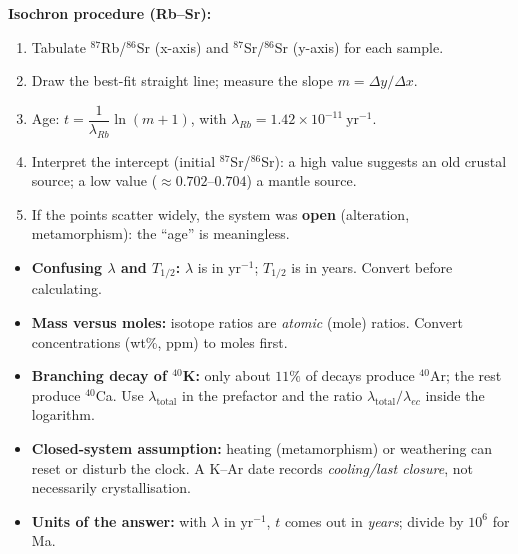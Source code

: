 \documentclass[11pt]{article}
\begin{document}
\begin{methode}
\textbf{Isochron procedure (Rb--Sr):}
\begin{enumerate}
    \item Tabulate $^{87}$Rb/$^{86}$Sr (x-axis) and $^{87}$Sr/$^{86}$Sr (y-axis) for each sample.
    \item Draw the best-fit straight line; measure the slope $m = \Delta y / \Delta x$.
    \item Age: $t = \dfrac{1}{\lambda_{Rb}} \ln(m+1)$, with $\lambda_{Rb} = 1.42 \times 10^{-11}\ \mathrm{yr^{-1}}$.
    \item Interpret the intercept (initial $^{87}$Sr/$^{86}$Sr): a high value suggests an old crustal source; a low value ($\approx 0.702$--$0.704$) a mantle source.
    \item If the points scatter widely, the system was \textbf{open} (alteration, metamorphism): the ``age'' is meaningless.
\end{enumerate}

\begin{attention}
\begin{itemize}
    \item \textbf{Confusing $\lambda$ and $T_{1/2}$:} $\lambda$ is in $\mathrm{yr^{-1}}$; $T_{1/2}$ is in years. Convert before calculating.
    \item \textbf{Mass versus moles:} isotope ratios are \emph{atomic} (mole) ratios. Convert concentrations (wt\%, ppm) to moles first.
    \item \textbf{Branching decay of $^{40}$K:} only about $11\%$ of decays produce $^{40}$Ar; the rest produce $^{40}$Ca. Use $\lambda_{\text{total}}$ in the prefactor and the ratio $\lambda_{\text{total}}/\lambda_{ec}$ inside the logarithm.
    \item \textbf{Closed-system assumption:} heating (metamorphism) or weathering can reset or disturb the clock. A K--Ar date records \emph{cooling/last closure}, not necessarily crystallisation.
    \item \textbf{Units of the answer:} with $\lambda$ in $\mathrm{yr^{-1}}$, $t$ comes out in \emph{years}; divide by $10^{6}$ for Ma.
\end{itemize}
\end{attention}
\end{methode}
\end{document}
